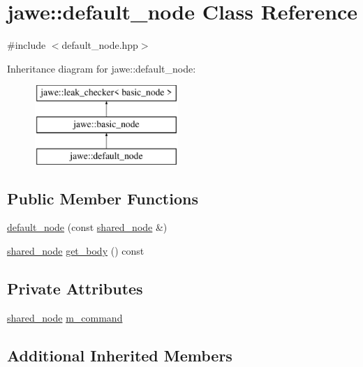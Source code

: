 \hypertarget{classjawe_1_1default__node}{}\section{jawe\+:\+:default\+\_\+node Class Reference}
\label{classjawe_1_1default__node}


{\ttfamily \#include $<$default\+\_\+node.\+hpp$>$}

Inheritance diagram for jawe\+:\+:default\+\_\+node\+:\begin{figure}[H]
\begin{center}
\leavevmode
\includegraphics[height=3.000000cm]{classjawe_1_1default__node}
\end{center}
\end{figure}
\subsection*{Public Member Functions}
\begin{DoxyCompactItemize}
\item 
\hyperlink{classjawe_1_1default__node_a7c1eb033a8801fd4f2d7c65733c8dfea}{default\+\_\+node} (const \hyperlink{namespacejawe_a3f307481d921b6cbb50cc8511fc2b544}{shared\+\_\+node} \&)
\item 
\hyperlink{namespacejawe_a3f307481d921b6cbb50cc8511fc2b544}{shared\+\_\+node} \hyperlink{classjawe_1_1default__node_a9ea25fb0259faec5fd9b7b89711a61da}{get\+\_\+body} () const
\end{DoxyCompactItemize}
\subsection*{Private Attributes}
\begin{DoxyCompactItemize}
\item 
\hyperlink{namespacejawe_a3f307481d921b6cbb50cc8511fc2b544}{shared\+\_\+node} \hyperlink{classjawe_1_1default__node_a425524b6bbd0d56f7c3b07b194e227d2}{m\+\_\+command}
\end{DoxyCompactItemize}
\subsection*{Additional Inherited Members}


